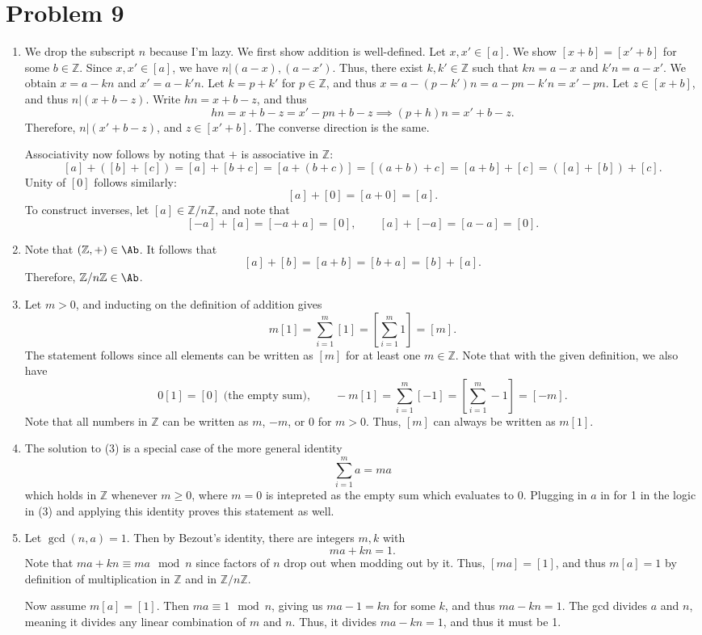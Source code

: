 \documentclass[11pt, letterpaper]{article}
\begin{document}
\section{Problem 9}

\begin{enumerate}
	\item We drop the subscript $n$ because I'm lazy. We first show addition is well-defined. Let $x,x'\in[a]$. We show $[x+b]=[x'+b]$ for some $b\in\mathbb{Z} $. Since $x,x'\in [a]$, we have $n|(a-x),(a-x')$. Thus, there exist $k,k'\in\mathbb{Z} $ such that $kn=a-x$ and $k'n=a-x'$. We obtain $x=a-kn$ and $x'=a-k'n$. Let $k=p+k'$ for $p\in\mathbb{Z} $, and thus $x=a-(p-k')n=a-pn-k'n=x'-pn$. Let $z\in[x+b]$, and thus $n|(x+b-z)$. Write $hn=x+b-z$, and thus
		\[
			hn=x+b-z=x'-pn+b-z \implies (p+h)n=x'+b-z
		.\]
		Therefore, $n|(x'+b-z)$, and $z\in[x'+b]$. The converse direction is the same.

		Associativity now follows by noting that $+$ is associative in $\mathbb{Z} $:
		\[
			[a]+([b]+[c])=[a]+[b+c]=[a+(b+c)]=[(a+b)+c]=[a+b]+[c]=([a]+[b])+[c]
		.\]
		Unity of $[0]$ follows similarly:
		\[
			[a]+[0]=[a+0]=[a]
		.\]
		To construct inverses, let $[a]\in\mathbb{Z} /n\mathbb{Z} $, and note that
		\[
			[-a]+[a]=[-a+a]=[0],\qquad [a]+[-a]=[a-a]=[0]
		.\]
	\item Note that $(\mathbb{Z} ,+)\in\Ab $. It follows that
		\[
			[a]+[b]=[a+ b]=[b+ a]=[b]+[a]
		.\]
		Therefore, $\mathbb{Z} /n\mathbb{Z} \in\Ab $.
	\item Let $m>0$, and inducting on the definition of addition gives
		\[
			m[1]=\sum_{i=1}^{m} [1] = \left[\sum_{i=1}^{m} 1\right]=[m]
		.\]
		The statement follows since all elements can be written as $[m]$ for at least one $m\in\mathbb{Z} $. Note that with the given definition, we also have
		\[
			0[1]=[0] \text{ (the empty sum)} ,\qquad -m[1]=\sum_{i=1}^{m} [-1]=\left[ \sum_{i=1}^{m} -1 \right] =[-m]
		.\]
		Note that all numbers in $\mathbb{Z} $ can be written as $m$, $-m$, or $0$ for $m>0$. Thus, $[m]$ can always be written as $m[1]$.
	\item The solution to (3) is a special case of the more general identity
		\[
			\sum_{i=1}^{m} a=ma
		\]
		which holds in $\mathbb{Z} $ whenever $m\geq 0$, where $m=0$ is intepreted as the empty sum which evaluates to 0. Plugging in $a$ in for 1 in the logic in (3) and applying this identity proves this statement as well.
	\item Let $\operatorname{gcd} (n,a)=1$. Then by Bezout's identity, there are integers $m,k$ with
		\[
			ma+kn=1
		.\]
		Note that $ma+kn \equiv ma\mod{n}$ since factors of $n$ drop out when modding out by it. Thus, $[ma]=[1]$, and thus $m[a]=1$ by definition of multiplication in $\mathbb{Z} $ and in $\mathbb{Z} /n\mathbb{Z} $.

		Now assume $m[a]=[1]$. Then $ma\equiv 1\mod{n}$, giving us $ma-1=kn$ for some $k$, and thus $ma-kn=1$. The gcd divides $a$ and $n$, meaning it divides any linear combination of $m$ and $n$. Thus, it divides $ma-kn=1$, and thus it must be 1.
\end{enumerate}
\end{document}

